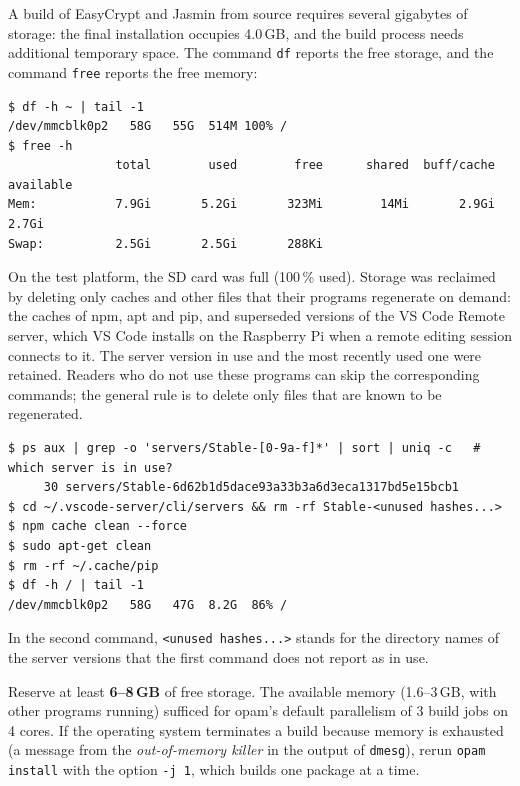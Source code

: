 \documentclass[11pt,a4paper]{article}
\newcommand{\cmd}[1]{\lstinline[style=shell,frame=none]{#1}}
\begin{document}
A build of EasyCrypt and Jasmin from source requires several gigabytes of
storage: the final installation occupies 4.0\,GB, and the build process
needs additional temporary space. The command \texttt{df} reports the free
storage, and the command \texttt{free} reports the free memory:

\begin{lstlisting}[style=shell]
$ df -h ~ | tail -1
/dev/mmcblk0p2   58G   55G  514M 100% /
$ free -h
               total        used        free      shared  buff/cache   available
Mem:           7.9Gi       5.2Gi       323Mi        14Mi       2.9Gi       2.7Gi
Swap:          2.5Gi       2.5Gi       288Ki
\end{lstlisting}

On the test platform, the SD card was full (100\,\% used). Storage was
reclaimed by deleting only caches and other files that their programs
regenerate on demand: the caches of npm, apt and pip, and superseded
versions of the VS Code Remote server, which VS Code installs on the
Raspberry Pi when a remote editing session connects to it. The server
version in use and the most recently used one were retained. Readers who do
not use these programs can skip the corresponding commands; the general
rule is to delete only files that are known to be regenerated.

\begin{lstlisting}[style=shell]
$ ps aux | grep -o 'servers/Stable-[0-9a-f]*' | sort | uniq -c   # which server is in use?
     30 servers/Stable-6d62b1d5dace93a33b3a6d3eca1317bd5e15bcb1
$ cd ~/.vscode-server/cli/servers && rm -rf Stable-<unused hashes...>
$ npm cache clean --force
$ sudo apt-get clean
$ rm -rf ~/.cache/pip
$ df -h / | tail -1
/dev/mmcblk0p2   58G   47G  8.2G  86% /
\end{lstlisting}

In the second command, \texttt{<unused hashes...>} stands for the
directory names of the server versions that the first command does not
report as in use.

\begin{note}
Reserve at least \textbf{6--8\,GB} of free storage. The available memory
(1.6--3\,GB, with other programs running) sufficed for opam's default
parallelism of 3 build jobs on 4 cores. If the operating system terminates a
build because memory is exhausted (a message from the \emph{out-of-memory
killer} in the output of \texttt{dmesg}), rerun \cmd{opam install} with the
option \cmd{-j 1}, which builds one package at a time.
\end{note}
\end{document}
